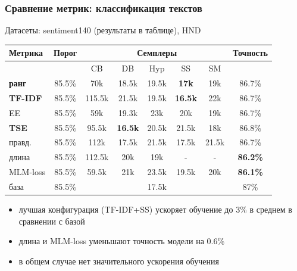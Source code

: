 \documentclass{beamer}
\begin{document}
\begin{frame}
	\frametitle{Сравнение метрик: классификация текстов}
	
	Датасеты: sentiment140 (результаты в таблице), HND
	\begin{table}
		\begin{tabular}{|l|c|ccccc|c|}
			\hline
			Метрика & Порог & & \multicolumn{3}{c}{Семплеры} & & Точность\\
			\hline
			& & CB & DB & Hyp & SS & SM & \\
			\hline
			{\bf ранг} & 85.5\% & 70k & 18.5k & 19.5k & {\bf 17k} & 19k & 86.7\% \\
			{\bf TF-IDF} & 85.5\% & 115.5k & 21.5k & 19.5k & {\bf 16.5k} & 22k & 86.7\% \\
			EE & 85.5\% & 59k & 19.3k & 23k & 20k & 19k & 86.7\% \\
			{\bf TSE} & 85.5\% & 95.5k & {\bf 16.5k} & 20.5k & 21.5k & 18k & 86.8\% \\
			правд. & 85.5\% & 112k & 17.5k & 21.5k & 17.5k & 21.5k & 86.7\% \\
			длина & 85.5\% & 112.5k & 20k & 19k & - & - & {\bf 86.2\%} \\
			MLM-loss & 85.5\% & 59.5k & 21k & 23.5k & 19.5k & 20k & {\bf 86.1\%} \\
			\hline
			база & 85.5\% & & & 17.5k & & & 87\% \\
			\hline
		\end{tabular}
	\end{table}
	\begin{itemize}
		\item лучшая конфигурация (TF-IDF+SS) ускоряет обучение до 3\% в среднем в сравнении с базой
		\item длина и MLM-loss уменьшают точность модели на 0.6\%
		\item в общем случае нет значительного ускорения обучения
	\end{itemize}
\end{frame}
\end{document}
